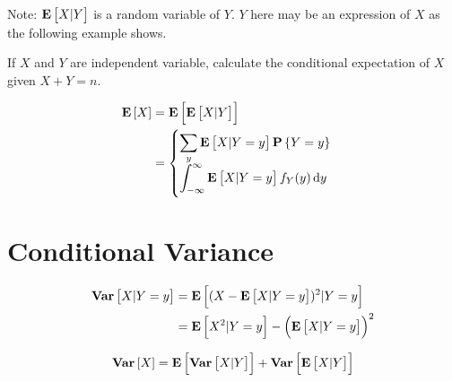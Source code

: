 Note: $\mathop{\bf E\/}\displaystyle \left[ X|Y \right]$ is a random variable of $Y$. $Y$ here may be an expression of $X$ as the following example shows.

\begin{example}
    If $X$ and $Y$ are independent variable, calculate the conditional expectation of $X$ given $X+Y=n$.
\end{example}


\begin{theorem}
    \begin{equation}
        \begin{aligned}
            \expect{X} &= \expect{ \expect{X|Y}} \\
            &= \begin{cases}
                \displaystyle \sum_y \expect{X|Y = y} \probability{Y=y} \\
                \displaystyle \int_{-\infty}^\infty \expect{X|Y=y} f_Y (y) \dif{y}
            \end{cases}
        \end{aligned}
    \end{equation}
\end{theorem}





\section{Conditional Variance}

\begin{theorem}
    \begin{equation}
    \begin{aligned}
        \mathop{\bf Var\/}\displaystyle \left[ X|Y=y \right] &= \mathop{\bf E\/}\displaystyle \left[ (X - \mathop{\bf E\/}\displaystyle \left[ X|Y=y \right])^2 | Y=y \right] \\
        &= \mathop{\bf E\/}\displaystyle \left[ X^2|Y=y \right]- \left(\mathop{\bf E\/}\displaystyle \left[ X|Y=y \right] \right)^2
    \end{aligned}
    \end{equation}
\end{theorem}

\begin{theorem}
 \begin{equation}
        \mathop{\bf Var\/}\displaystyle \left[ X \right] = \mathop{\bf E\/}\displaystyle \left[ \mathop{\bf Var\/}\displaystyle \left[ X|Y \right] \right] + \mathop{\bf Var\/}\displaystyle \left[ \mathop{\bf E\/}\displaystyle \left[ X|Y \right] \right]
    \end{equation}    
\end{theorem}








